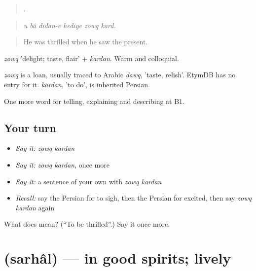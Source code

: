 \begin{quote}
     .
\end{quote}

\begin{quote}
\emph{u bâ didan-e hediye zowq kard.}
\end{quote}

\begin{quote}
He was thrilled when he saw the present.
\end{quote}

\emph{zowq} 'delight; taste, flair' + \emph{kardan}. Warm and colloquial.

\begin{cousinweb}
\emph{zowq} is a loan, usually traced to Arabic \emph{ḏawq}, 'taste, relish'. EtymDB has no entry for it. \emph{kardan}, 'to do', is inherited Persian.
\end{cousinweb}

\begin{grammarlens}[title={What you've built}]
One more word for telling, explaining and describing at B1.
\end{grammarlens}

\subsection*{Your turn}
\begin{itemize}
\raggedright
  \item \emph{Say it:} \emph{zowq kardan}
  \item \emph{Say it:} \emph{zowq kardan}, once more
  \item \emph{Say it:} a sentence of your own with \emph{zowq kardan}
  \item \emph{Recall:} say the Persian for to sigh, then the Persian for excited, then say \emph{zowq kardan} again
\end{itemize}

\begin{tcolorbox}[breakable,colback=teal!4,colframe=teal!35!black,title={Before you move on}]
What does   mean? (\textquotedblleft{}To be thrilled\textquotedblright{}.) Say it once more.
\end{tcolorbox}
\section[\texorpdfstring{\fa{سرحال} (sarhâl)}{سرحال (sarhâl)}]{ (sarhâl) — in good spirits; lively}

